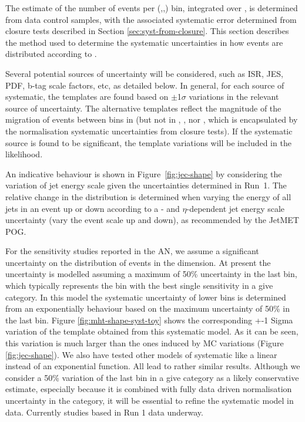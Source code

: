 The estimate of the number of events per (\njet,\nb,\HT) bin,
integrated over \mht, is determined from data control samples, with
the associated systematic error determined from closure tests
described in Section \ref{sec:syst-from-closure}. This section
describes the method used to determine the systematic uncertainties in
how events are distributed according to \mht. 

Several potential sources of uncertainty will be considered, such as
ISR, JES, PDF, b-tag scale factors, etc, as detailed below. In
general, for each source of systematic, the \mht templates are found
based on $\pm$1$\sigma$ variations in the relevant source of
uncertainty. The alternative templates reflect the magnitude of the
migration of events between bins in \mht (but not in \njet, \nb, nor
\HT, which is encapsulated by the normalisation systematic
uncertainties from closure tests). If the systematic source is found
to be significant, the template variations will be included in the
likelihood. 

An indicative behaviour is shown in Figure~\ref{fig:jec-shape} by
considering the variation of jet energy scale given the uncertainties
determined in Run~1. The relative change in the \mht distribution is
determined when varying the energy of all jets in an event up or down
according to a \pt- and $\eta$-dependent jet energy scale uncertainty
(\ie vary the event scale up and down), as recommended by the JetMET
POG. 

For the sensitivity studies reported in the AN, we assume a significant 
uncertainty on the distribution of events in the \MHT dimension. 
At present the uncertainty is modelled assuming a maximum of 50\% uncertainty in the last \MHT bin, 
which typically represents the bin with the best single sensitivity in a give \HT category. 
In this model the systematic uncertainty of lower \MHT bins is determined 
from an exponentially behaviour based on the maximum uncertainty of 50\% in the last \MHT bin. 
Figure \ref{fig:mht-shape-syst-toy} shows the corresponding +-1 Sigma variation of the 
\MHT template obtained from this systematic model. 
As it can be seen, this variation is much larger than the ones induced by MC variations (Figure \ref{fig:jec-shape}).  
We also have tested other models of \MHT systematic like a linear instead of an exponential function. 
All lead to rather similar results. Although we consider a 50\% variation of the 
last \MHT bin in a give \HT category as a likely conservative estimate, 
especially because it is combined with fully data driven normalisation uncertainty in the \HT category, 
it will be essential to refine the systematic \MHT model in data. 
Currently studies based in Run 1 data underway. 

